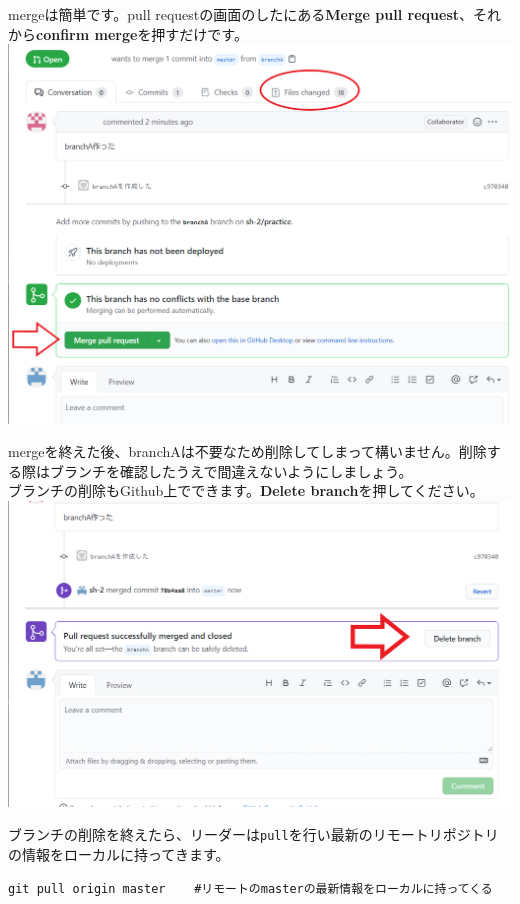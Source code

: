 \documentclass[
]{book}
\begin{document}
mergeは簡単です。pull requestの画面のしたにある\textbf{Merge pull request}、それから\textbf{confirm merge}を押すだけです。
\includegraphics{pics/branch02.png}

mergeを終えた後、branchAは不要なため削除してしまって構いません。削除する際はブランチを確認したうえで間違えないようにしましょう。\\
ブランチの削除もGithub上でできます。\textbf{Delete branch}を押してください。
\includegraphics{pics/branch03.png}

ブランチの削除を終えたら、リーダーは\texttt{pull}を行い最新のリモートリポジトリの情報をローカルに持ってきます。

\begin{verbatim}
git pull origin master    #リモートのmasterの最新情報をローカルに持ってくる
\end{verbatim}
\end{document}
